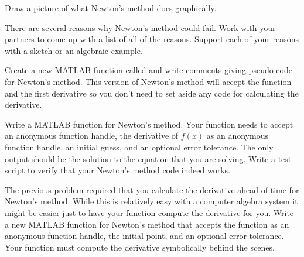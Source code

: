 \begin{problem}
    Draw a picture of what Newton's method does graphically.
\end{problem}

\begin{problem}\label{prob:newton_fail}
    There are several reasons why Newton's method could fail.  Work with your partners to
    come up with a list of all of the reasons.  Support each of your reasons with a
    sketch or an algebraic example.
\end{problem}

\begin{problem}
    Create a new MATLAB function called  and write comments giving
    pseudo-code for Newton's method.  This version of Newton's method will accept the
    function and the first derivative so you don't need to set aside any code for
    calculating the derivative.
\end{problem}

\begin{problem}
    Write a MATLAB function for Newton's method.  Your function needs to accept an
    anonymous function handle, the derivative of $f(x)$ as an anonymous function handle, an initial
    guess, and an optional error
    tolerance. The only output should be the solution to the equation that you are
    solving.  Write a test script to verify that your Newton's method code indeed works.
    \\
\end{problem}

\begin{problem}
    The previous problem required that you calculate the derivative ahead of time for
    Newton's method.  While this is relatively easy with a computer algebra system it
    might be easier just to have your function compute the derivative for you.  Write a
    new MATLAB function for Newton's method that accepts the function as an anonymous
    function handle, the initial point, and an optional error tolerance.  Your function
    must compute the derivative symbolically behind the scenes. \\
\end{problem}

